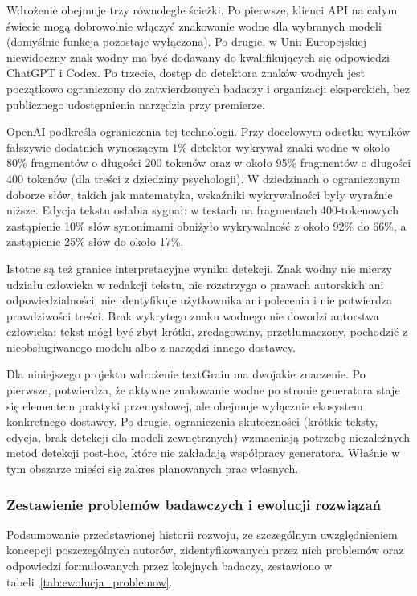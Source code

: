 Wdrożenie obejmuje trzy równoległe ścieżki. Po pierwsze, klienci API na całym świecie mogą dobrowolnie włączyć znakowanie wodne dla wybranych modeli (domyślnie funkcja pozostaje wyłączona). Po drugie, w Unii Europejskiej niewidoczny znak wodny ma być dodawany do kwalifikujących się odpowiedzi ChatGPT i Codex. Po trzecie, dostęp do detektora znaków wodnych jest początkowo ograniczony do zatwierdzonych badaczy i organizacji eksperckich, bez publicznego udostępnienia narzędzia przy premierze.

OpenAI podkreśla ograniczenia tej technologii. Przy docelowym odsetku wyników fałszywie dodatnich wynoszącym 1\% detektor wykrywał znaki wodne w około 80\% fragmentów o długości 200 tokenów oraz w około 95\% fragmentów o długości 400 tokenów (dla treści z dziedziny psychologii). W dziedzinach o ograniczonym doborze słów, takich jak matematyka, wskaźniki wykrywalności były wyraźnie niższe. Edycja tekstu osłabia sygnał: w testach na fragmentach 400-tokenowych zastąpienie 10\% słów synonimami obniżyło wykrywalność z około 92\% do 66\%, a zastąpienie 25\% słów do około 17\%.

Istotne są też granice interpretacyjne wyniku detekcji. Znak wodny nie mierzy udziału człowieka w redakcji tekstu, nie rozstrzyga o prawach autorskich ani odpowiedzialności, nie identyfikuje użytkownika ani polecenia i nie potwierdza prawdziwości treści. Brak wykrytego znaku wodnego nie dowodzi autorstwa człowieka: tekst mógł być zbyt krótki, zredagowany, przetłumaczony, pochodzić z nieobsługiwanego modelu albo z narzędzi innego dostawcy.

Dla niniejszego projektu wdrożenie textGrain ma dwojakie znaczenie. Po pierwsze, potwierdza, że aktywne znakowanie wodne po stronie generatora staje się elementem praktyki przemysłowej, ale obejmuje wyłącznie ekosystem konkretnego dostawcy. Po drugie, ograniczenia skuteczności (krótkie teksty, edycja, brak detekcji dla modeli zewnętrznych) wzmacniają potrzebę niezależnych metod detekcji post-hoc, które nie zakładają współpracy generatora. Właśnie w tym obszarze mieści się zakres planowanych prac własnych.

\subsubsection{Zestawienie problemów badawczych i ewolucji rozwiązań}

Podsumowanie przedstawionej historii rozwoju, ze szczególnym uwzględnieniem koncepcji poszczególnych autorów, zidentyfikowanych przez nich problemów oraz odpowiedzi formułowanych przez kolejnych badaczy, zestawiono w tabeli~\ref{tab:ewolucja_problemow}.

